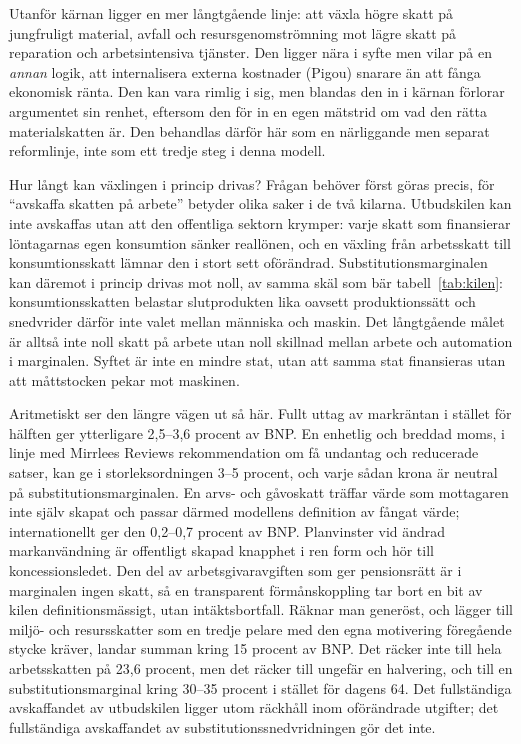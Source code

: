 \documentclass[11pt]{article}
\begin{document}
Utanför kärnan ligger en mer långtgående linje: att växla högre skatt på jungfruligt material, avfall och resursgenomströmning mot lägre skatt på reparation och arbetsintensiva tjänster. Den ligger nära i syfte men vilar på en \emph{annan} logik, att internalisera externa kostnader (Pigou) snarare än att fånga ekonomisk ränta. Den kan vara rimlig i sig, men blandas den in i kärnan förlorar argumentet sin renhet, eftersom den för in en egen mätstrid om vad den rätta materialskatten är. Den behandlas därför här som en närliggande men separat reformlinje, inte som ett tredje steg i denna modell.

Hur långt kan växlingen i princip drivas? Frågan behöver först göras precis, för \enquote{avskaffa skatten på arbete} betyder olika saker i de två kilarna. Utbudskilen kan inte avskaffas utan att den offentliga sektorn krymper: varje skatt som finansierar löntagarnas egen konsumtion sänker reallönen, och en växling från arbetsskatt till konsumtionsskatt lämnar den i stort sett oförändrad. Substitutionsmarginalen kan däremot i princip drivas mot noll, av samma skäl som bär tabell~\ref{tab:kilen}: konsumtionsskatten belastar slutprodukten lika oavsett produktionssätt och snedvrider därför inte valet mellan människa och maskin. Det långtgående målet är alltså inte noll skatt på arbete utan noll skillnad mellan arbete och automation i marginalen. Syftet är inte en mindre stat, utan att samma stat finansieras utan att måttstocken pekar mot maskinen.

Aritmetiskt ser den längre vägen ut så här. Fullt uttag av markräntan i stället för hälften ger ytterligare 2,5--3,6 procent av BNP. En enhetlig och breddad moms, i linje med Mirrlees Reviews rekommendation om få undantag och reducerade satser, kan ge i storleksordningen 3--5 procent, och varje sådan krona är neutral på substitutionsmarginalen. En arvs- och gåvoskatt träffar värde som mottagaren inte själv skapat och passar därmed modellens definition av fångat värde; internationellt ger den 0,2--0,7 procent av BNP. Planvinster vid ändrad markanvändning är offentligt skapad knapphet i ren form och hör till koncessionsledet. Den del av arbetsgivaravgiften som ger pensionsrätt är i marginalen ingen skatt, så en transparent förmånskoppling tar bort en bit av kilen definitionsmässigt, utan intäktsbortfall. Räknar man generöst, och lägger till miljö- och resursskatter som en tredje pelare med den egna motivering föregående stycke kräver, landar summan kring 15 procent av BNP. Det räcker inte till hela arbetsskatten på 23,6 procent, men det räcker till ungefär en halvering, och till en substitutionsmarginal kring 30--35 procent i stället för dagens 64. Det fullständiga avskaffandet av utbudskilen ligger utom räckhåll inom oförändrade utgifter; det fullständiga avskaffandet av substitutionssnedvridningen gör det inte.
\end{document}

